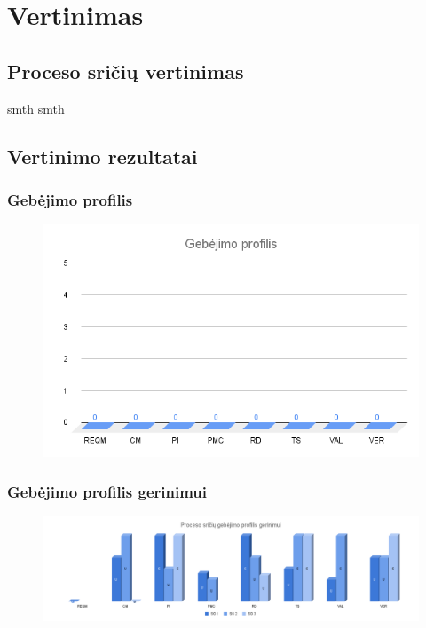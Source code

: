 \section{Vertinimas}
\subsection{Proceso sričių vertinimas}
smth smth
\subsection{Vertinimo rezultatai}
\subsubsection{Gebėjimo profilis}
\begin{figure}[h]
    \centering
    \includegraphics[width=0.75\linewidth]{gerinimas//img/profilis.png}
\end{figure}

\subsubsection{Gebėjimo profilis gerinimui}
\begin{figure}[h]
    \centering
    \includegraphics[width=\linewidth]{gerinimas//img/gerinimui.png}
\end{figure}